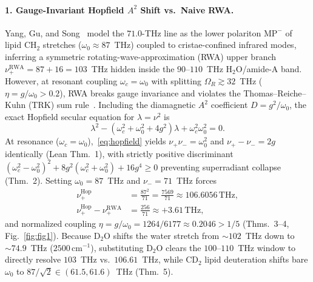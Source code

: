 \documentclass[10pt,twocolumn]{article}
\begin{document}
\paragraph{1. Gauge-Invariant Hopfield $A^2$ Shift vs.\ Naive RWA.}
Yang, Gu, and Song~\cite{YangGuSong2026Mito} model the $71.0$-THz line as the lower polariton $\mathrm{MP}^-$ of lipid $\text{CH}_2$ stretches ($\omega_0 \approx 87$~THz) coupled to cristae-confined infrared modes, inferring a symmetric rotating-wave-approximation (RWA) upper branch $\nu_+^{\mathrm{RWA}} = 87 + 16 = 103$~THz hidden inside the $90$--$110$~THz $\text{H}_2\text{O}$/amide-A band. However, at resonant coupling $\omega_c = \omega_0$ with splitting $\Omega_R \gtrsim 32$~THz ($\eta = g/\omega_0 > 0.2$), RWA breaks gauge invariance and violates the Thomas--Reiche--Kuhn (TRK) sum rule~\cite{Hopfield1958Polariton,Rzazewski1975NoGo,FriskKockum2019USC}. Including the diamagnetic $A^2$ coefficient $D = g^2/\omega_0$, the exact Hopfield secular equation for $\lambda = \nu^2$ is
\begin{equation}
\label{eq:hopfield}
\lambda^2 - (\omega_c^2 + \omega_0^2 + 4g^2)\lambda + \omega_c^2\omega_0^2 = 0.
\end{equation}
At resonance ($\omega_c = \omega_0$),~\eqref{eq:hopfield} yields $\nu_+ \nu_- = \omega_0^2$ and $\nu_+ - \nu_- = 2g$ identically (Lean Thm.~1), with strictly positive discriminant $(\omega_c^2-\omega_0^2)^2 + 8g^2(\omega_c^2+\omega_0^2) + 16g^4 \ge 0$ preventing superradiant collapse (Thm.~2). Setting $\omega_0 = 87$~THz and $\nu_- = 71$~THz forces
\begin{equation}
\label{eq:shift}
\begin{aligned}
\nu_+^{\mathrm{Hop}} &= \frac{87^2}{71} = \frac{7569}{71} \approx 106.6056\,\mathrm{THz}, \\
\nu_+^{\mathrm{Hop}} - \nu_+^{\mathrm{RWA}} &= \frac{256}{71} \approx +3.61\,\mathrm{THz},
\end{aligned}
\end{equation}
and normalized coupling $\eta = g/\omega_0 = 1264/6177 \approx 0.2046 > 1/5$ (Thms.~3--4, Fig.~\ref{fig:fig1}). Because $\text{D}_2\text{O}$ shifts the water stretch from $\sim 102$~THz down to $\sim 74.9$~THz ($2500\,\mathrm{cm}^{-1}$), substituting $\text{D}_2\text{O}$ clears the $100$--$110$~THz window to directly resolve $103$~THz vs.\ $106.61$~THz, while $\text{CD}_2$ lipid deuteration shifts bare $\omega_0$ to $87/\sqrt{2} \in (61.5, 61.6)$~THz (Thm.~5).
\end{document}
